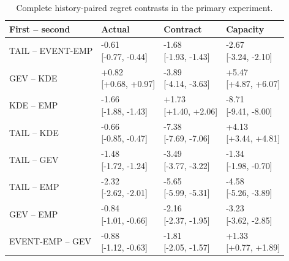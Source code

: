 \begingroup
\fontsize{8.5}{10.5}\selectfont\setlength{\tabcolsep}{3.0pt}\renewcommand{\arraystretch}{1.23}
\begin{table}[tbp]\centering
\caption{Complete history-paired regret contrasts in the primary experiment.}\label{tab:final-si-12}
\begin{tabular}{@{}llll@{}}\toprule
First -- second & Actual & Contract & Capacity\\\midrule
TAIL -- EVENT-EMP & \shortstack{-0.61\\{}[-0.77, -0.44]} & \shortstack{-1.68\\{}[-1.93, -1.43]} & \shortstack{-2.67\\{}[-3.24, -2.10]}\\
GEV -- KDE & \shortstack{+0.82\\{}[+0.68, +0.97]} & \shortstack{-3.89\\{}[-4.14, -3.63]} & \shortstack{+5.47\\{}[+4.87, +6.07]}\\
KDE -- EMP & \shortstack{-1.66\\{}[-1.88, -1.43]} & \shortstack{+1.73\\{}[+1.40, +2.06]} & \shortstack{-8.71\\{}[-9.41, -8.00]}\\
TAIL -- KDE & \shortstack{-0.66\\{}[-0.85, -0.47]} & \shortstack{-7.38\\{}[-7.69, -7.06]} & \shortstack{+4.13\\{}[+3.44, +4.81]}\\
TAIL -- GEV & \shortstack{-1.48\\{}[-1.72, -1.24]} & \shortstack{-3.49\\{}[-3.77, -3.22]} & \shortstack{-1.34\\{}[-1.98, -0.70]}\\
TAIL -- EMP & \shortstack{-2.32\\{}[-2.62, -2.01]} & \shortstack{-5.65\\{}[-5.99, -5.31]} & \shortstack{-4.58\\{}[-5.26, -3.89]}\\
GEV -- EMP & \shortstack{-0.84\\{}[-1.01, -0.66]} & \shortstack{-2.16\\{}[-2.37, -1.95]} & \shortstack{-3.23\\{}[-3.62, -2.85]}\\
EVENT-EMP -- GEV & \shortstack{-0.88\\{}[-1.12, -0.63]} & \shortstack{-1.81\\{}[-2.05, -1.57]} & \shortstack{+1.33\\{}[+0.77, +1.89]}\\

\end{tabular}
\end{table}
